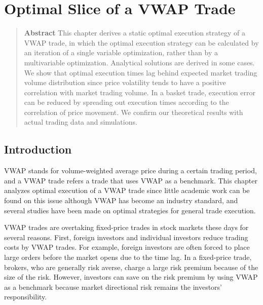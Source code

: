 


\chapter{Optimal Slice of a VWAP Trade}\label{chap_s}


\begin{quote}
{\bf Abstract} \quad This chapter derives a static optimal execution strategy of a VWAP trade, in which the optimal execution strategy can be calculated by an iteration of a single variable optimization, rather than by a multivariable optimization.  Analytical solutions are derived in some cases.  We show that optimal execution times lag behind expected market trading volume distribution since price volatility tends to have a positive correlation with market trading volume.  In a basket trade, execution error can be reduced by spreading out execution times according to the correlation of price movement.  We confirm our theoretical results with actual trading data and simulations.
\vspace*{0.5cm}

\end{quote}


\section{Introduction}\label{sec_s1}
VWAP stands for volume-weighted average price during a certain trading period, and a VWAP trade refers a trade that uses VWAP as a benchmark.  This chapter analyzes optimal execution of a VWAP trade since little academic work can be found on this issue although VWAP has become an industry standard, and several studies have been made on optimal strategies for general trade execution.

VWAP trades are overtaking fixed-price trades in stock markets these days for several reasons.  First, foreign investors and individual investors reduce trading costs by VWAP trades.  For example, foreign investors are often forced to place large orders before the market opens due to the time lag.  In a fixed-price trade, brokers, who are generally risk averse, charge a large risk premium because of the size of the risk.  However, investors can save on the risk premium by using VWAP as a benchmark because market directional risk remains the investors' responsibility. 


